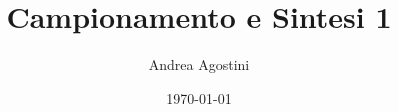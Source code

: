 \documentclass[11pt]{report}
\begin{document}
\title{Campionamento e Sintesi 1}


\author{Andrea Agostini}
\date{\today}
\maketitle






\end{document}
